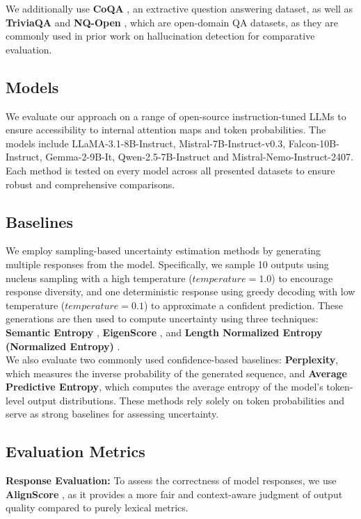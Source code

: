 \documentclass[letterpaper]{article} %
\begin{document}
We additionally use \textbf{CoQA} \cite{reddy2019coqaconversationalquestionanswering}, an extractive question answering dataset, as well as \textbf{TriviaQA} \cite{joshi2017triviaqalargescaledistantly} and \textbf{NQ-Open} \cite{47761}, which are open-domain QA datasets, as they are commonly used in prior work on hallucination detection for comparative evaluation.
\subsection{Models}
We evaluate our approach on a range of open-source instruction-tuned LLMs to ensure accessibility to internal attention maps and token probabilities. The models include LLaMA-3.1-8B-Instruct, Mistral-7B-Instruct-v0.3, Falcon-10B-Instruct, Gemma-2-9B-It, Qwen-2.5-7B-Instruct and Mistral-Nemo-Instruct-2407. Each method is tested on every model across all presented datasets to ensure robust and comprehensive comparisons.


\subsection{Baselines}
We employ sampling-based uncertainty estimation methods by generating multiple responses from the model. Specifically, we sample 10 outputs using nucleus sampling with a high temperature ($temperature = 1.0$) to encourage response diversity, and one deterministic response using greedy decoding with low temperature ($temperature = 0.1$) to approximate a confident prediction. These generations are then used to compute uncertainty using three techniques: \textbf{Semantic Entropy} \cite{kuhn2023semanticuncertaintylinguisticinvariances}, \textbf{EigenScore} \cite{chen2024insidellmsinternalstates}, and \textbf{Length Normalized Entropy (Normalized Entropy)} \cite{malinin2021uncertainty}.\\
We also evaluate two commonly used confidence-based baselines: \textbf{Perplexity}, which measures the inverse probability of the generated sequence, and \textbf{Average Predictive Entropy}, which computes the average entropy of the model's token-level output distributions. These methods rely solely on token probabilities and serve as strong baselines for assessing uncertainty.

\subsection{Evaluation Metrics}
\textbf{Response Evaluation:}
To assess the correctness of model responses, we use \textbf{AlignScore} \cite{zha2023alignscoreevaluatingfactualconsistency}, as it provides a more fair and context-aware judgment of output quality compared to purely lexical metrics. 
\end{document}
